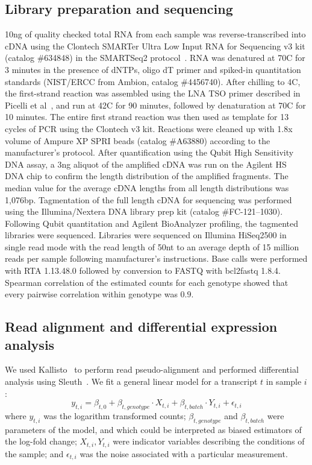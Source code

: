 \documentclass[9pt,twocolumn,twoside]{pnas-new}
\begin{document}
{\subsection*{Library preparation and sequencing}
10ng of quality checked total RNA from each sample was reverse-transcribed into
cDNA using the Clontech SMARTer Ultra Low Input RNA for Sequencing v3 kit
(catalog \#634848) in the SMARTSeq2 protocol~\cite{Picelli2014}.  RNA was
denatured at 70\degree{}C for 3 minutes in the presence of dNTPs, oligo dT
primer and spiked-in quantitation standards (NIST/ERCC from Ambion, catalog
\#4456740).  After chilling to 4\degree{}C, the first-strand reaction was
assembled using the LNA TSO primer described in Picelli et
al~\cite{Picelli2014}, and run at 42\degree{}C for 90 minutes, followed by
denaturation at 70\degree{}C for 10 minutes.  The entire first strand reaction
was then used as template for 13 cycles of PCR using the Clontech v3 kit.
Reactions were cleaned up with 1.8x volume of Ampure XP SPRI beads (catalog
\#A63880) according to the manufacturer’s protocol.  After quantification using
the Qubit High Sensitivity DNA assay, a 3ng aliquot of the amplified cDNA was
run on the Agilent HS DNA chip to confirm the length distribution of the
amplified fragments.  The median value for the average cDNA lengths from all
length distributions was 1,076bp.  Tagmentation of the full length cDNA for
sequencing was performed using the Illumina/Nextera DNA library prep kit
(catalog \#FC-121--1030). Following Qubit quantitation and Agilent BioAnalyzer
profiling, the tagmented libraries were sequenced. Libraries were sequenced on
Illumina HiSeq2500 in single read mode with the read length of 50nt to an
average depth of 15 million reads per sample following manufacturer's
instructions. Base calls were performed with RTA 1.13.48.0 followed by
conversion to FASTQ with bcl2fastq 1.8.4. Spearman correlation of the estimated
counts for each genotype showed that every pairwise correlation within genotype
was $0.9$.

\subsection*{Read alignment and differential expression analysis} We used
Kallisto~\cite{Bray2016} to perform read pseudo-alignment and performed
differential analysis using Sleuth~\cite{Pimentel2016}. We fit a general linear
model for a transcript $t$ in sample $i$:
\begin{equation}
  y_{t,i} = \beta_{t, 0} + \beta_{t, genotype}\cdot{}X_{t, i} +
  \beta_{t, batch}\cdot{}Y_{t, i} + \epsilon_{t, i}
\end{equation}
where $y_{t, i}$ was the logarithm transformed counts; $\beta_{t, genotype}$ and
$\beta_{t, batch}$ were parameters of the model, and which could be interpreted
as biased estimators of the log-fold change; $X_{t, i}, Y_{t, i}$ were indicator
variables describing the conditions of the sample; and $\epsilon_{t, i}$ was the
noise associated with a particular measurement.

}
\end{document}
